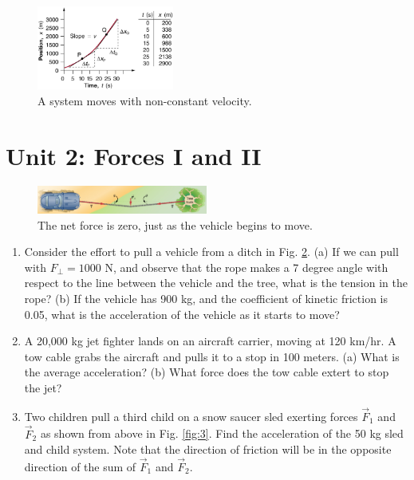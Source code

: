 \documentclass[10pt]{article}
\begin{document}
\begin{figure}
\centering
\includegraphics[width=0.4\textwidth]{slope2.jpeg}
\caption{\label{fig:1} A system moves with non-constant velocity.}
\end{figure}

\section{Unit 2: Forces I and II}

\begin{figure}
\centering
\includegraphics[width=0.5\textwidth]{rope.jpeg}
\caption{\label{fig:2} The net force is zero, just as the vehicle begins to move.}
\end{figure}

\begin{enumerate}
\item Consider the effort to pull a vehicle from a ditch in Fig. \ref{fig:2}. (a) If we can pull with $F_{\perp} = 1000$ N, and observe that the rope makes a 7 degree angle with respect to the line between the vehicle and the tree, what is the tension in the rope? (b) If the vehicle has 900 kg, and the coefficient of kinetic friction is 0.05, what is the acceleration of the vehicle as it starts to move? \\ \vspace{3.5cm}
\item A 20,000 kg jet fighter lands on an aircraft carrier, moving at 120 km/hr. A tow cable grabs the aircraft and pulls it to a stop in 100 meters. (a) What is the average acceleration? (b) What force does the tow cable extert to stop the jet? \\ \vspace{3.5cm}
\item Two children pull a third child on a snow saucer sled exerting forces $\vec{F}_1$ and $\vec{F}_2$ as shown from above in Fig. \ref{fig:3}. Find the acceleration of the 50 kg sled and child system. Note that the direction of friction will be in the opposite direction of the sum of $\vec{F}_1$ and $\vec{F}_2$. \\ \vspace{2cm}
\end{enumerate}
\end{document}

